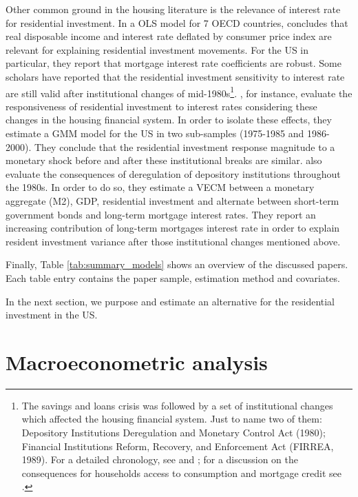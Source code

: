 \documentclass[12pt, a4paper]{article}
\begin{document}
Other common ground in the housing literature is the relevance of interest rate for residential investment.
In a OLS model for 7 OECD countries, \textcite{egebo_1990_MODEL} concludes that real disposable income and interest rate deflated by consumer price index are relevant for explaining residential investment movements.
For the US in particular, they report that mortgage interest rate coefficients are robust.
Some scholars have reported that the residential investment sensitivity to interest rate are still valid after institutional changes of mid-1980s\footnote{The savings and loans crisis was followed by a set of institutional changes which affected the housing financial system. Just to name two of them: Depository Institutions Deregulation and Monetary Control Act (1980); Financial Institutions Reform, Recovery, and Enforcement Act (FIRREA, 1989). For a detailed chronology, see  \textcite[Appendix B]{mccarthyMonetaryPolicyTransmission2002} and \textcite{green_american_2005}; for a discussion on the consequences for households access to consumption and mortgage credit see \textcite{federal_deposit_insurance_corporation_savings_1997,wall_too_2010}.}.
\textcite{mccarthyMonetaryPolicyTransmission2002}, for instance, evaluate the responsiveness of residential investment to interest rates considering these changes in the housing financial system.
In order to isolate these effects, they estimate  a GMM model for the US in two sub-samples (1975-1985 and 1986-2000).
They conclude that the residential investment response magnitude to a monetary shock before and after these institutional breaks are similar.
\textcite{gauger_residential_2003} also evaluate the consequences of deregulation of depository institutions throughout the 1980s.
In order to do so, they estimate a VECM between a monetary aggregate (M2), GDP, residential investment and alternate between short-term government bonds and long-term mortgage interest rates.
They report an increasing contribution of long-term mortgages interest rate in order to explain resident investment variance after those institutional changes mentioned above.


Finally, Table \ref{tab:summary_models} shows an overview of the discussed papers.
Each table entry contains the paper sample, estimation method and covariates.

In the next section, we purpose and estimate an alternative for the residential investment in the US.




\section{Macroeconometric analysis}
\label{sec:org4481656}
\label{sec:VECM}
\end{document}
